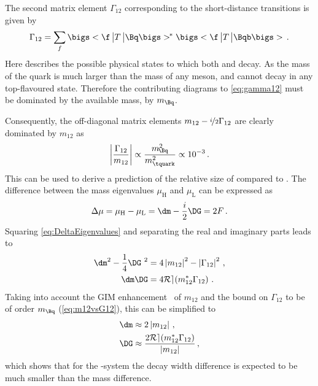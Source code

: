 The second matrix element $\Gamma_{12}$ corresponding to the short-distance transitions is given by
\begin{equation}
\Gamma_{12}=\sum_f\bigs<\f\,\big|T\,\big|\Bq\bigs>^{\kern -0.08em *}\bigs<\f\,\big|T\,\big|\Bqb\bigs>\,.\label{eq:gamma12}
\end{equation}
Here \f describes the possible physical states to which both \Bq and \Bqb decay.
As the mass of the \tquark quark is much larger than the mass of any \B meson, \Bq and \Bqb cannot decay in any top-flavoured state.
Therefore the contributing diagrams to \cref{eq:gamma12} must be dominated by the available mass, \ie by $m_\Bq$.

Consequently, the off-diagonal matrix elements $m_{12}-\nicefrac{i}{2}\Gamma_{12}$ are clearly dominated by $m_{12}$ as
\begin{equation}
\left|\frac{\Gamma_{12}}{m_{12}}\right|\propto\frac{m^2{}_{\kern -5.4pt\Bq}}{m_\tquark^2}\propto10^{-3}\,.\label{eq:m12vsG12}
\end{equation}
This can be used to derive a prediction of the relative size of \DG compared to \dm.
The difference between the mass eigenvalues $\mu_\text{H}$ and $\mu_\text{L}$ can be expressed as
\begin{equation}
\Delta\mu=\mu_\text{H}-\mu_\text{L}=\dm-\frac{i}{2}\DG=2F\,.\label{eq:DeltaEigenvalues}
\end{equation}
Squaring \cref{eq:DeltaEigenvalues} and separating the real and imaginary parts leads to
\begin{equation}
\begin{aligned}
\dm^2-\frac{1}{4}\DG^{\kern 3.4pt2}&=4\left|m_{12}\right|^2-\left|\Gamma_{12}\right|^2\,,\\
\dm\DG&=4\mathcal{R{}e}\!\left(m_{12}^\ast\Gamma_{12}\right)\,.
\end{aligned}
\end{equation}
Taking into account the GIM enhancement~\cite{PhysRevD.2.1285} of $m_{12}$ and the bound on $\Gamma_{12}$ to be of order $m_\Bq$ (\cref{eq:m12vsG12}), this can be simplified to
\begin{equation}
\begin{aligned}
\dm&\approx2\left|m_{12}\right|\,,\\
\DG&\approx\frac{2\mathcal{R{}e}\!\left(m_{12}^\ast\Gamma_{12}\right)}{\left|m_{12}\right|}\,,
\end{aligned}
\end{equation}
which shows that for the \Bz-system the decay width difference is expected to be much smaller than the mass difference.

